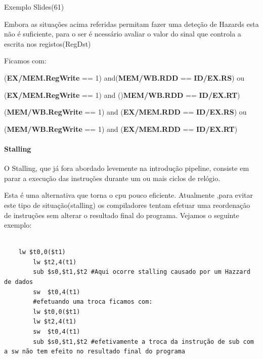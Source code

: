 \documentclass[10pt,a4paper]{book}
\begin{document}
		Exemplo Slides(61)

		\newline

		Embora as situações acima referidas permitam fazer uma deteção de Hazards esta não é suficiente, para o ser é ncessário avaliar o valor do sinal que controla a escrita nos registos(RegDst)

		\newline
		Ficamos com:

		(\textbf{EX/MEM.RegWrite} == 1) and(\textbf{MEM/WB.RDD} == \textbf{ID/EX.RS}) ou

		(\textbf{EX/MEM.RegWrite} == 1) and ()\textbf{MEM/WB.RDD} == \textbf{ID/EX.RT})

		(\textbf{MEM/WB.RegWrite} == 1) and (\textbf{EX/MEM.RDD} == \textbf{ID/EX.RS}) ou

		(\textbf{MEM/WB.RegWrite} == 1) and (\textbf{EX/MEM.RDD} == \textbf{ID/EX.RT})




	 \paragraph{Stalling}

	 O Stalling, que já fora abordado levemente na introdução pipeline, consiste em parar a execução das instruções durante um ou mais ciclos de relógio.


	 Esta é uma alternativa que torna o cpu pouco eficiente. Atualmente ,para evitar este tipo de situação(stalling) os compiladores tentam efetuar uma reordenação de instruções sem alterar o resultado final do programa. Vejamos o seguinte exemplo:

	 \begin{lstlisting}

    lw $t0,0($t1)
		lw $t2,4(t1)
		sub $s0,$t1,$t2 #Aqui ocorre stalling causado por um Hazzard de dados
		sw  $t0,4(t1)
 		#efetuando uma troca ficamos com:
		lw $t0,0($t1)
		lw $t2,4(t1)
		sw  $t0,4(t1)
		sub $s0,$t1,$t2 #efetivamente a troca da instrução de sub com a sw não tem efeito no resultado final do programa
	 \end{lstlisting}





























 		\printindex
\end{document}
